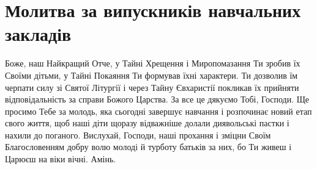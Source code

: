 \documentclass[chapters.tex]{subfiles}
\begin{document}
\section{Молитва за випускників навчальних закладів}
Боже, наш Найкращий Отче, у Тайні Хрещення і Миропомазання Ти зробив їх Своїми дітьми, у Тайні Покаяння Ти формував їхні характери. Ти дозволив їм черпати силу зі Святої Літургії і через Тайну Євхаристії покликав їх прийняти відповідальність за справи Божого Царства. За все це дякуємо Тобі, Господи. Ще просимо Тебе за молодь, яка сьогодні завершує навчання і розпочинає новий етап свого життя, щоб наші діти щоразу відважніше долали диявольські пастки і нахили до поганого. Вислухай, Господи, наші прохання і зміцни Своїм Благословенням добру волю молоді й турботу батьків за них, бо Ти живеш і Царюєш на віки вічні. Амінь.
\end{document}
